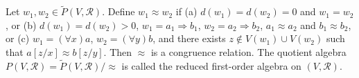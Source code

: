 Let $w_1, w_2 \in \tilde{P}(V, \mathcal{R})$. Define $w_1 \approx w_2$ if
(a) $d(w_1) = d(w_2) = 0$ and $w_1 = w_2$, or
(b) $d(w_1) = d(w_2) > 0$, $w_1 = a_1 \Rightarrow b_1$, $w_2 = a_2 \Rightarrow b_2$, $a_1 \approx a_2$ and $b_1 \approx b_2$, or
(c) $w_1 = (\forall x)a$, $w_2 = (\forall y)b$, and there exists $z \notin V(w_1) \cup V(w_2)$ such that $a[z/x] \approx b[z/y]$.
Then $\approx$ is a congruence relation. The quotient algebra $P(V, \mathcal{R}) = \tilde{P}(V, \mathcal{R})/{\approx}$ is called the reduced first-order algebra on $(V, \mathcal{R})$.
